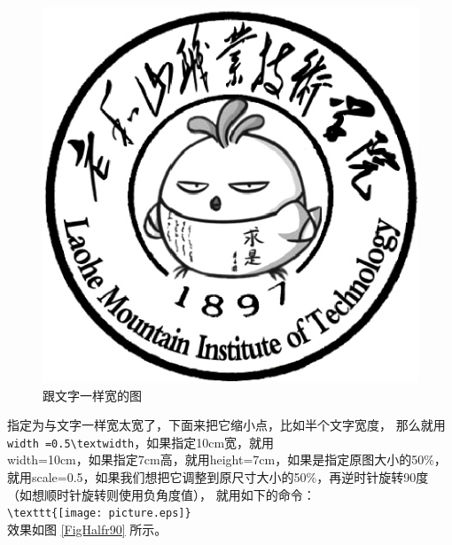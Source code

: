 \begin{figure}[htb]
\centering
\includegraphics[width=\textwidth]{./Pictures/LHS.eps}
\caption{跟文字一样宽的图}
\label{FigTextWidth}
\end{figure}

指定为与文字一样宽太宽了，下面来把它缩小点，比如半个文字宽度，
那么就用\\
\verb+width =0.5\textwidth+，如果指定10cm宽，就用\\
width=10cm，如果指定7cm高，就用height=7cm，如果是指定原图大小的50\%，\\
就用scale=0.5，如果我们想把它调整到原尺寸大小的50\%，再逆时针旋转90度
（如想顺时针旋转则使用负角度值），
就用如下的命令：\\
\verb+\texttt{[image: picture.eps]}+\\
效果如图 \ref{FigHalfr90} 所示。

